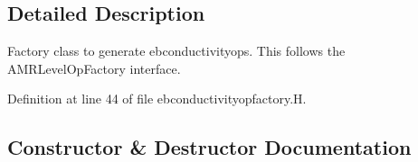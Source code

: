 \subsection{Detailed Description}
Factory class to generate ebconductivityops. This follows the A\+M\+R\+Level\+Op\+Factory interface. 

Definition at line 44 of file ebconductivityopfactory.\+H.



\subsection{Constructor \& Destructor Documentation}
